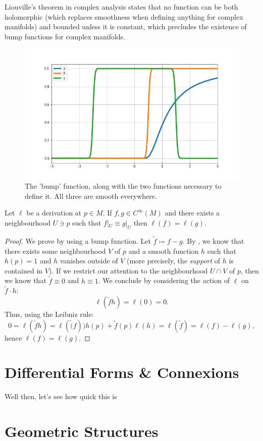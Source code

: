 \documentclass[fleqn, 11pt]{report}
\begin{document}
\begin{remark}
	Liouville's theorem in complex analysis states that no function can be both holomorphic (which replaces smoothness when defining anything for complex manifolds) and bounded unless it is constant, which precludes the existence of bump functions for complex manifolds.
\end{remark}

\begin{figure}[h]
	\centering
	\includegraphics[width=\textwidth]{bumpFunction.png}
	\caption{The 'bump' function, along with the two functions necessary to define it. All three are smooth everywhere.}\label{fig:bumpFunction}
\end{figure}

\begin{lemma}\label{lem:derivationEquivalence}
	Let $ \ell $ be a derivation at $ p \in M $. If $ f, g \in C^\infty(M) $ and there exists a neighbourhood $ U \ni p $ such that $ f|_U \equiv g|_U $ then $ \ell(f) = \ell(g) $.
\end{lemma}

\begin{proof}
	We prove  by using a bump function. Let $ \tilde{f} \coloneqq f - g $. By , we know that there exists some neighbourhood $ V $ of $ p $ and a smooth function $ h $ such that $ h(p) = 1 $ and $ h $ vanishes outside of $ V $ (more precisely, the \textit{support} of $ h $ is contained in $ V $). If we restrict our attention to the neighbourhood $ U \cap V $ of $ p $, then we know that $ \tilde{f} \equiv 0 $ and $ h \equiv 1 $. We conclude by considering the action of $ \ell $ on $ \tilde{f} \cdot h $:
		\begin{equation}\label{key}
			\ell(\tilde{f} h ) = \ell(0) = 0.
		\end{equation}
	Thus, using the Leibniz rule:
		\begin{equation}\label{key}
			0 = \ell(\tilde{f}h) = \ell(\tilde(f))h(p) + \tilde{f}(p)\ell(h) = \ell(\tilde{f}) = \ell(f) - \ell(g),
		\end{equation}
	hence $ \ell(f) = \ell(g) $.
\end{proof}

\chapter{Differential Forms \& Connexions}
Well then, let's see how quick this is
\chapter{Geometric Structures}
\end{document}
